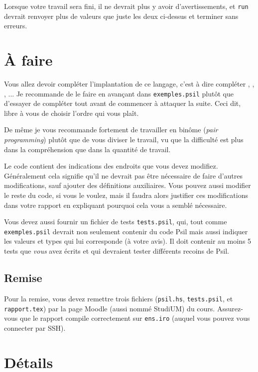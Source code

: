 \documentclass{article}
\begin{document}
Lorsque votre travail sera fini, il ne devrait plus y avoir
d'avertissements, et \texttt{run} devrait renvoyer plus de valeurs que
juste les deux ci-dessus et terminer sans erreurs.

\section{À faire}

Vous allez devoir compléter l'implantation de ce langage, c'est à dire
compléter , , , ...
Je recommande de le faire en avançant dans
\texttt{exemples.psil} plutôt que d'essayer de compléter tout  avant
de commencer à attaquer la suite.
Ceci dit, libre à vous de choisir l'ordre qui vous plaît.

De même je vous recommande fortement de travailler en binôme (\emph{pair
programming}) plutôt que de vous diviser le travail, vu que la difficulté
est plus dans la compréhension que dans la quantité de travail.

Le code contient des indications des endroits que vous devez modifiez.
Généralement cela signifie qu'il ne devrait pas être nécessaire de faire
d'autres modifications, sauf ajouter des définitions auxiliaires.  Vous pouvez
aussi modifier le reste du code, si vous le voulez, mais il faudra alors
justifier ces modifications dans votre rapport en expliquant pourquoi cela
vous a semblé nécessaire.

Vous devez aussi fournir un fichier de tests \texttt{tests.psil}, qui, tout
comme \texttt{exemples.psil} devrait non seulement contenir du code Psil
mais aussi indiquer les valeurs et types qui lui corresponde (à votre avis).
Il doit contenir au moins 5 tests que \emph{vous} avez écrits et qui
devraient tester différents recoins de Psil.

\subsection{Remise}

Pour la remise, vous devez remettre trois fichiers (\texttt{psil.hs},
\texttt{tests.psil}, et \texttt{rapport.tex}) par la page Moodle (aussi
nommé StudiUM) du cours.  Assurez-vous que le rapport compile correctement
sur \texttt{ens.iro} (auquel vous pouvez vous connecter par SSH).

\section{Détails}
\end{document}
